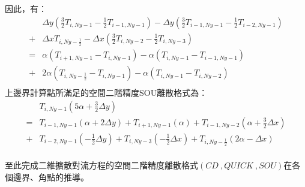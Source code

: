 \documentclass[12pt]{article}
\begin{document}
\noindent 因此，有：
\begin{equation}
\begin{split}
  &\Delta y(\frac{3}{2}T_{i,Ny-1} - \frac{1}{2}T_{i-1,Ny-1}) - \Delta y(\frac{3}{2}T_{i-1,Ny-1} - \frac{1}{2}T_{i-2,Ny-1})\\
  + &\Delta x T_{i,Ny-\frac{1}{2}}- \Delta x (\frac{3}{2}T_{i,Ny-2}-\frac{1}{2}T_{i,Ny-3}) \\
  = &\alpha (T_{i+1,Ny-1} -T_{i,Ny-1} ) - \alpha(T_{i,Ny-1} -T_{i-1,Ny-1}) \\
  + &2\alpha (T_{i,Ny-\frac{1}{2}} -T_{i,Ny-1}) - \alpha(T_{i,Ny-1}-T_{i,Ny-2}) \\
\end{split}
\end{equation}
\noindent 上邊界計算點所滿足的空間二階精度SOU離散格式為：\\
\begin{equation}
\begin{split}
  &T_{i,Ny-1}(5\alpha+\frac{3}{2}\Delta y)\\
   = &T_{i-1,Ny-1}(\alpha + 2\Delta y)+T_{i+1,Ny-1}(\alpha)+T_{i-1,Ny-2}(\alpha+\frac{3}{2}\Delta x)\\
   + &T_{i-2,Ny-1}(-\frac{1}{2}\Delta y)+T_{i,Ny-3}(-\frac{1}{2}\Delta x)+T_{i,Ny-\frac{1}{2}}(2\alpha-\Delta x)\\
\end{split}
\end{equation}
\vspace{0.6em}

\noindent 至此完成二維擴散對流方程的空間二階精度離散格式$(CD\ , QUICK\ , SOU)$在各個邊界、角點的推導。
\end{document}
